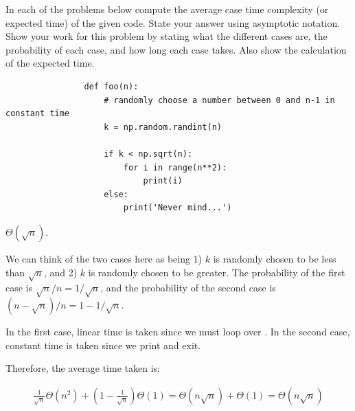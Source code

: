 \begin{prob}
    In each of the problems below compute the average case time complexity (or
    expected time) of the given code. State your answer using asymptotic
    notation. Show your work for this problem by stating what the different
    cases are, the probability of each case, and how long each case takes. Also
    show the calculation of the expected time.

    \begin{subprobset}
        \begin{subprob}
            \begin{verbatim}
                def foo(n):
                    # randomly choose a number between 0 and n-1 in constant time
                    k = np.random.randint(n)

                    if k < np.sqrt(n):
                        for i in range(n**2):
                            print(i)
                    else:
                        print('Never mind...')

            \end{verbatim}

            \begin{soln}
                $\Theta(\sqrt{n})$.

                We can think of the two cases here as being 1) $k$ is randomly chosen
                to be less than $\sqrt{n}$, and 2) $k$ is randomly chosen to be greater.
                The probability of the first case is $\sqrt{n} / n = 1/\sqrt{n}$, and
                the probability of the second case is $(n - \sqrt{n})/n = 1 - 1/\sqrt{n}$.

                In the first case, linear time is taken since we must loop over .
                In the second case, constant time is taken since we print 
                and exit.

                Therefore, the average time taken is:

                \begin{align*}
                    \frac{1}{\sqrt{n}} \Theta(n^2) + \left(1 - \frac{1}{\sqrt{n}}\right) \Theta(1)
                    =
                        \Theta(n\sqrt{n}) + \Theta(1)
                    =
                        \Theta(n\sqrt{n})
                \end{align*}

            \end{soln}
        \end{subprob}



\end{subprobset}
\end{prob}
